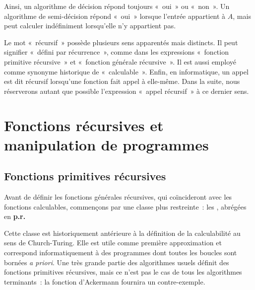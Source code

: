Ainsi, un algorithme de décision répond toujours « oui » ou « non ».
Un algorithme de semi-décision répond « oui » lorsque l'entrée
appartient à $A$, mais peut calculer indéfiniment lorsqu'elle n'y
appartient pas.

\thingy Le mot « récursif » possède plusieurs sens apparentés mais
distincts.  Il peut signifier « défini par récurrence », comme dans les
expressions « fonction primitive récursive » et « fonction générale
récursive ».  Il est aussi employé comme synonyme historique de
« calculable ».  Enfin, en informatique, un appel est dit récursif
lorsqu'une fonction fait appel à elle-même.  Dans la suite, nous
réserverons autant que possible l'expression « appel récursif » à ce
dernier sens.

\section{Fonctions récursives et manipulation de programmes}

\subsection{Fonctions primitives récursives}
\label{subsection-primitive-recursive-functions}

\thingy Avant de définir les fonctions générales récursives, qui
coïncideront avec les fonctions calculables, commençons par une classe
plus restreinte : les , abrégées en
\textbf{p.r.}

Cette classe est historiquement antérieure à la définition de la
calculabilité au sens de Church-Turing.  Elle est utile comme première
approximation et correspond informatiquement à des programmes dont
toutes les boucles sont bornées \textit{a priori}.  Une très grande
partie des algorithmes usuels définit des fonctions primitives
récursives, mais ce n'est pas le cas de tous les algorithmes
terminants : la fonction d'Ackermann fournira un contre-exemple.

